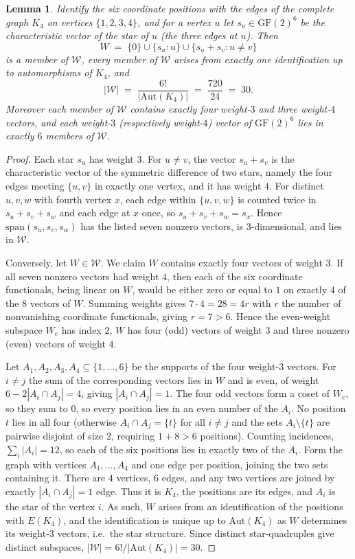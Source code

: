 \documentclass[12pt]{article}
\newtheorem{lem}[thm]{Lemma}
\theoremstyle{definition}
\numberwithin{equation}{section}
\newcommand{\W}{\mathcal{W}}
\newcommand{\GF}[1]{\mathrm{GF}(#1)}
\begin{document}
\begin{lem}\label{lem:K4}
Identify the six coordinate positions with the edges of the complete graph $K_4$ on vertices $\{1,2,3,4\}$, and for a vertex $u$ let $s_u\in\GF2^6$ be the characteristic vector of the star of $u$ (the three edges at $u$).  Then
\[
  W \;=\; \{0\}\cup\{s_u : u\}\cup\{s_u+s_v : u\neq v\}
\]
is a member of $\W$, every member of $\W$ arises from exactly one identification up to automorphisms of $K_4$, and
\[
  |\W| \;=\; \frac{6!}{|\mathrm{Aut}(K_4)|}\;=\;\frac{720}{24}\;=\;30 .
\]
Moreover each member of $\W$ contains exactly four weight-$3$ and three weight-$4$ vectors, and each weight-$3$ (respectively weight-$4$) vector of $\GF2^6$ lies in exactly $6$ members of $\W$.
\end{lem}

\begin{proof}
Each star $s_u$ has weight $3$.  For $u\neq v$, the vector $s_u+s_v$ is the characteristic vector of the symmetric difference of two stars, namely the four edges meeting $\{u,v\}$ in exactly one vertex, and it has weight $4$.  For distinct $u,v,w$ with fourth vertex $x$, each edge within $\{u,v,w\}$ is counted twice in $s_u+s_v+s_w$ and each edge at $x$ once, so $s_u+s_v+s_w=s_x$.  Hence $\mathrm{span}(s_u,s_v,s_w)$ has the listed seven nonzero vectors, is $3$-dimensional, and lies in $\W$.

Conversely, let $W\in\W$.  We claim $W$ contains exactly four vectors of weight $3$.  If all seven nonzero vectors had weight $4$, then each of the six coordinate functionals, being linear on $W$, would be either zero or equal to $1$ on exactly $4$ of the $8$ vectors of $W$. Summing weights gives $7\cdot4=28=4r$ with $r$ the number of nonvanishing coordinate functionals, giving $r=7>6$.  Hence the even-weight subspace $W_e$
has index $2$, $W$ has four (odd) vectors of weight $3$ and three nonzero (even) vectors of weight $4$.

Let $A_1,A_2,A_3,A_4\subseteq\{1,\ldots,6\}$ be the supports of the four weight-$3$ vectors.  For $i\neq j$ the sum of the corresponding vectors lies in $W$ and is even, of weight $6-2|A_i\cap A_j|=4$, giving $|A_i\cap A_j|=1$.  The four odd vectors form a coset of $W_e$, so they sum to $0$, so every position lies in an even number of the $A_i$.  No position $t$ lies in all four (otherwise $A_i\cap A_j=\{t\}$ for all $i\ne j$ and the sets $A_i\setminus\{t\}$ are pairwise disjoint of size $2$, requiring $1+8>6$ positions).  Counting incidences, $\sum_i|A_i|=12$, so each of the six positions lies in exactly two of the $A_i$.  Form the graph with vertices $A_1,\ldots,A_4$ and one edge per position, joining the two sets containing it. There are $4$ vertices, $6$ edges, and any two vertices are joined by exactly $|A_i\cap A_j|=1$ edge. Thus it is $K_4$, the positions are its edges, and $A_i$ is the star of the vertex $i$.  As such, $W$ arises from an identification of the positions with $E(K_4)$, and the identification is unique up to $\mathrm{Aut}(K_4)$ as $W$ determines its weight-$3$ vectors, i.e.\ the star structure. Since distinct star-quadruples give distinct subspaces, $|\W|=6!/|\mathrm{Aut}(K_4)|=30$.


\end{proof}
\end{document}
